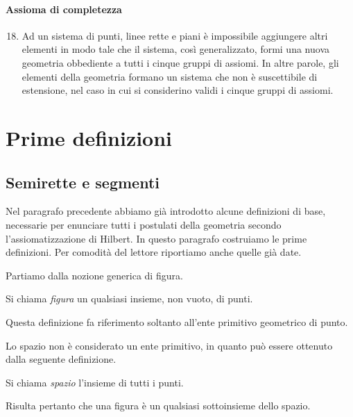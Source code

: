 \paragraph{Assioma di completezza}

\begin{enumerate}[label=\Roman{*}.]
\setcounter{enumi}{17}
\item Ad un sistema di punti, linee rette e piani è impossibile aggiungere altri elementi in modo tale che il sistema, così generalizzato, formi una nuova geometria obbediente a tutti i cinque gruppi di assiomi. In altre parole, gli elementi della geometria formano un sistema che non è suscettibile di estensione, nel caso in cui si considerino validi i cinque gruppi di assiomi.
\end{enumerate}

\vspazio\ovalbox{\risolvii \ref{ese:1.33}, \ref{ese:1.34}, \ref{ese:1.36}, \ref{ese:1.37}, \ref{ese:1.38}, \ref{ese:1.39}, \ref{ese:1.40}, \ref{ese:1.41}, \ref{ese:1.42}}


\section{Prime definizioni}

\subsection{Semirette e segmenti}

Nel paragrafo precedente abbiamo già introdotto alcune definizioni di base, necessarie per enunciare tutti i postulati della geometria secondo l'assiomatizzazione di Hilbert. In questo paragrafo costruiamo le prime definizioni. Per comodità del lettore riportiamo anche quelle già date.

Partiamo dalla nozione generica di figura.
\begin{definizione}
Si chiama \emph{figura} un qualsiasi insieme, non vuoto, di punti.
\end{definizione}
Questa definizione fa riferimento soltanto all'ente primitivo geometrico di punto.

Lo spazio non è considerato un ente primitivo, in quanto può essere ottenuto dalla seguente definizione.
\begin{definizione}
Si chiama \emph{spazio} l'insieme di tutti i punti.
\end{definizione}
Risulta pertanto che una figura è un qualsiasi sottoinsieme dello spazio.

